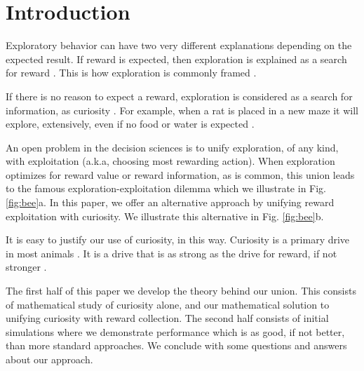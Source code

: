 \section*{Introduction}
Exploratory behavior can have two very different explanations depending on the expected result. If reward is expected, then exploration is explained as a search for reward \cite{Gupta2006,Sutton2018,Woodgate2017,Lee2011a,Schulz2018a,Calhoun2014}. This is how exploration is commonly framed \cite{Sutton2018}. 

If there is no reason to expect a reward, exploration is considered as a search for information, as curiosity \cite{Berlyne1950,Schmidhuber1991,Kidd2015,Jaegle2019,Sumner2019,Wang2019,Auersperg2015}. For example, when a rat is placed in a new maze it will explore, extensively, even if no food or water is expected \cite{Rosenberg2021}.

An open problem in the decision sciences is to unify exploration, of any kind, with exploitation (a.k.a, choosing most rewarding action). When exploration optimizes for reward value or reward information, as is common, this union leads to the famous exploration-exploitation dilemma \cite{Kelly1956,Berger-Tal2014,Dayan1996,Thrun1992,Mehlhorn2015,Kobayashi2019} which we illustrate in Fig. \ref{fig:bee}a. In this paper, we offer an alternative approach by unifying reward exploitation with curiosity. We illustrate this alternative in Fig. \ref{fig:bee}b.  

It is easy to justify our use of curiosity, in this way. Curiosity is a primary drive in most animals \cite{Berlyne1950,Loewenstein1994,Inglis2001}. It is a drive that is as strong as the drive for reward, if not stronger \cite{Loewenstein1994,Kidd2015,Gottlieb2018,Sumner2019,Gopnik2020,Song2019,Wang2019}. 

The first half of this paper we develop the theory behind our union. This consists of mathematical study of curiosity alone, and our mathematical solution to unifying curiosity with reward collection. The second half consists of initial simulations where we demonstrate performance which is as good, if not better, than more standard approaches. We conclude with some questions and answers about our approach.

